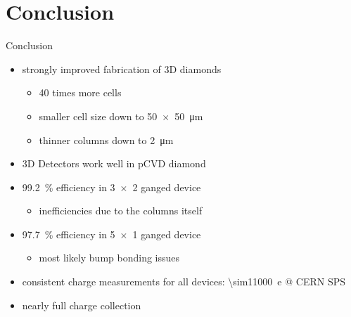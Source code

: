 \section{Conclusion}
\begin{frame}{Conclusion}

	\begin{minipage}[c][6cm]{\textwidth}
		\begin{itemize}\itemfill
			\item strongly improved fabrication of 3D diamonds
			\begin{itemize}
				\item 40 times more cells
				\item smaller cell size down to \SI{50x50}{\micro\meter}
				\item thinner columns down to \SI{2}{\micro\meter}\vspace*{2ex}
			\end{itemize}
			\item 3D Detectors work well in pCVD diamond
			\item \SI{99.2}{\%} efficiency in \SI{3x2}{} ganged device
			\begin{itemize}
				\item inefficiencies due to the columns itself\vspace*{2ex}
			\end{itemize}
			\item \SI{97.7}{\%} efficiency in \SI{5x1}{} ganged device
			\begin{itemize}
				\item most likely bump bonding issues\vspace*{2ex}
			\end{itemize}
			\item consistent charge measurements for all devices: \SI{\sim11000}{e} @ CERN SPS
			\item nearly full charge collection
		\end{itemize}
	\end{minipage}
	
\end{frame}
